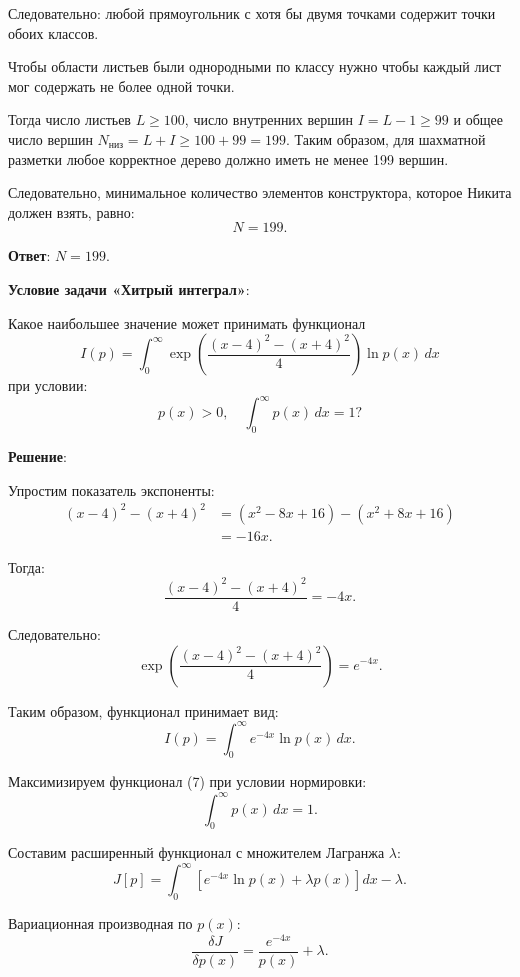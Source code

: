 \documentclass[pract]{SCWorks}
\begin{document}
    Следовательно: любой прямоугольник с хотя бы двумя точками содержит точки обоих классов.

    Чтобы области листьев были однородными по классу нужно чтобы каждый лист мог содержать не более одной точки.

    Тогда число листьев $L \ge 100$, число внутренних вершин $I = L - 1 \ge 99$ и общее число вершин $N_{\text{низ}} = L + I \ge 100 + 99 = 199$.
    Таким образом, для шахматной разметки любое корректное дерево должно иметь не менее 199 вершин.

    Следовательно, минимальное количество элементов конструктора, которое Никита должен взять, равно:
    \[
    \boxed{N = 199}.
    \]

    \textbf{Ответ}: $N = 199$.

    \textbf{Условие задачи «Хитрый интеграл»}:

    Какое наибольшее значение может принимать функционал
    \[
    I(p) = \int_{0}^{\infty} \exp\left(\frac{(x-4)^2 - (x+4)^2}{4}\right) \ln p(x)\, dx
    \]
    при условии:
    \[
    p(x) > 0, \quad \int_{0}^{\infty} p(x)\, dx = 1?
    \]

    \textbf{Решение}:

    Упростим показатель экспоненты:
    \[
    \begin{aligned}
    (x-4)^2 - (x+4)^2 &= (x^2 - 8x + 16) - (x^2 + 8x + 16) \\
    &= -16x.
    \end{aligned}
    \]

    Тогда:
    \[
    \frac{(x-4)^2 - (x+4)^2}{4} = -4x.
    \]

    Следовательно:
    \[
    \exp\left(\frac{(x-4)^2 - (x+4)^2}{4}\right) = e^{-4x}.
    \]

    Таким образом, функционал принимает вид:
    \begin{equation}
    I(p) = \int_{0}^{\infty} e^{-4x} \ln p(x)\, dx.
    \end{equation}

    Максимизируем функционал (7) при условии нормировки:
    \[
    \int_{0}^{\infty} p(x)\, dx = 1.
    \]

    Составим расширенный функционал с множителем Лагранжа $\lambda$:
    \[
    J[p] = \int_{0}^{\infty} \left[e^{-4x} \ln p(x) + \lambda p(x)\right] dx - \lambda.
    \]

    Вариационная производная по $p(x)$:
    \[
    \frac{\delta J}{\delta p(x)} = \frac{e^{-4x}}{p(x)} + \lambda.
    \]
\end{document}
